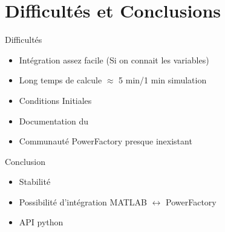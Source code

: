 \section{Difficultés et Conclusions}


\begin{frame}{Difficultés}
\pause
\begin{itemize}
	\item Intégration assez facile \pause (Si on connait les variables)\pause
	\item Long temps de calcule $ \approx $ 5 min/1 min simulation \pause
	\item Conditions Initiales  \pause
	\item Documentation du \powerfactory
	\item Communauté PowerFactory presque inexistant \pause 
\end{itemize}
\end{frame}

\begin{frame}{Conclusion}
\begin{itemize}
	\item Stabilité \pause
	\item Possibilité d'intégration MATLAB $ \leftrightarrow $ PowerFactory\pause
	\item API python 
\end{itemize}
\end{frame}